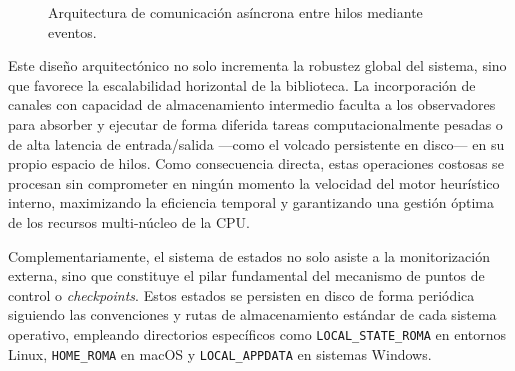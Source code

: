 \documentclass[12pt,a4paper,twoside,openright]{book}
\begin{document}
\begin{figure}[htbp]
    \caption{Arquitectura de comunicación asíncrona entre hilos mediante eventos.}
    \label{fig:concurrencia_observers}
\end{figure}

        Este diseño arquitectónico no solo incrementa la robustez global del sistema, sino que favorece la escalabilidad horizontal de la biblioteca. La incorporación de canales con capacidad de almacenamiento intermedio faculta a los observadores para absorber y ejecutar de forma diferida tareas computacionalmente pesadas o de alta latencia de entrada/salida —como el volcado persistente en disco— en su propio espacio de hilos. Como consecuencia directa, estas operaciones costosas se procesan sin comprometer en ningún momento la velocidad del motor heurístico interno, maximizando la eficiencia temporal y garantizando una gestión óptima de los recursos multi-núcleo de la CPU.
        
        Complementariamente, el sistema de estados no solo asiste a la monitorización externa, sino que constituye el pilar fundamental del mecanismo de puntos de control o \textit{checkpoints}. Estos estados se persisten en disco de forma periódica siguiendo las convenciones y rutas de almacenamiento estándar de cada sistema operativo, empleando directorios específicos como \texttt{LOCAL\_STATE\_ROMA} en entornos Linux, \texttt{HOME\_ROMA} en macOS y \texttt{LOCAL\_APPDATA} en sistemas Windows.
\end{document}
